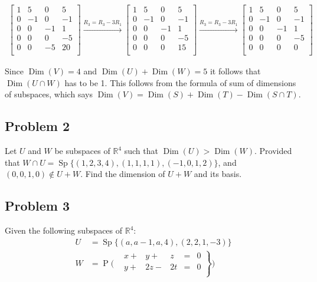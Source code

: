 \documentclass[fleqn]{article}
\DeclareMathOperator{\Sp}{Sp}
\DeclareMathOperator{\Solutions}{P}
\DeclareMathOperator{\Dim}{Dim}
\begin{document}
\begin{multline*}
\begin{bmatrix}
    1 &  5 &  0 &  5 \\
    0 & -1 &  0 & -1 \\
    0 &  0 & -1 &  1 \\
    0 &  0 &  0 & -5 \\
    0 &  0 & -5 &  20 \\
  \end{bmatrix}
  \xrightarrow{R_3 = R_3 - 3R_1}
  \begin{bmatrix}
    1 &  5 &  0 &  5 \\
    0 & -1 &  0 & -1 \\
    0 &  0 & -1 &  1 \\
    0 &  0 &  0 & -5 \\
    0 &  0 &  0 &  15 \\
  \end{bmatrix}
  \xrightarrow{R_3 = R_3 - 3R_1}
  \begin{bmatrix}
    1 &  5 &  0 &  5 \\
    0 & -1 &  0 & -1 \\
    0 &  0 & -1 &  1 \\
    0 &  0 &  0 & -5 \\
    0 &  0 &  0 &  0 \\
  \end{bmatrix}
\end{multline*}

Since $\Dim(V)=4$ and $\Dim(U)+\Dim(W)=5$ it follows that $\Dim(U\cap W)$ has
to be 1.  This follows from the formula of sum of dimensions of subspaces, which
says $\Dim(V)=\Dim(S)+\Dim(T)-\Dim(S\cap T)$.
\subsection{Problem 2}
\label{sec-1-2}

Let $U$ and $W$ be subspaces of $\mathbb{R}^4$ such that $\Dim(U)>\Dim(W)$.
Provided that $W \cap U = \Sp \{(1, 2, 3, 4), (1, 1, 1, 1), (-1, 0, 1, 2)\}$,
and $(0, 0, 1, 0) \not \in U + W$.  Find the dimension of $U+W$ and its basis.
\subsection{Problem 3}
\label{sec-1-3}

Given the following subspaces of $\mathbb{R}^4$:
\begin{align*}
  U &= \Sp \{ (a, a-1, a, 4), (2, 2, 1, -3) \} \\
  W &= \Solutions\Big(\left.
    \begin{alignedat}{5}
      & x + & y +  & z  &{}={}& 0 \\
      & y + & 2z - & 2t &{}={}& 0 \\
    \end{alignedat}
  \right\}\Big)
\end{align*}
\end{document}
